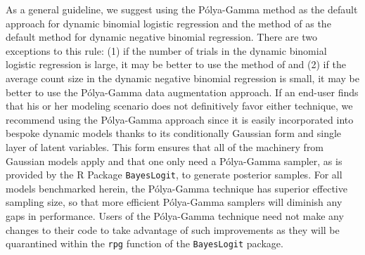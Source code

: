 \documentclass[12pt]{article}
\newcommand{\Polya}{P\'{o}lya}
\begin{document}
As a general guideline, we suggest using the \Polya-Gamma method as the default
approach for dynamic binomial logistic regression and the method of
\cite{fruhwirth-schnatter-etal-2009} as the default method for dynamic negative
binomial regression.  There are two exceptions to this rule: (1) if the number
of trials in the dynamic binomial logistic regression is large, it may be better
to use the method of \cite{fussl-etal-2013} and (2) if the average count size in
the dynamic negative binomial regression is small, it may be better to use the
\Polya-Gamma data augmentation approach.  If an end-user finds that his or her
modeling scenario does not definitively favor either technique, we recommend
using the \Polya-Gamma approach since it is easily incorporated into bespoke
dynamic models thanks to its conditionally Gaussian form and single layer of
latent variables.  This form ensures that all of the machinery from Gaussian
models apply and that one only need a \Polya-Gamma sampler, as is provided by
the R Package \texttt{BayesLogit}, to generate posterior samples.  For all
models benchmarked herein, the \Polya-Gamma technique has superior effective
sampling size, so that more efficient \Polya-Gamma samplers will diminish any
gaps in performance.  Users of the \Polya-Gamma technique need not make any
changes to their code to take advantage of such improvements as they will be
quarantined within the \texttt{rpg} function of the \texttt{BayesLogit} package.

\appendix



\end{document}
